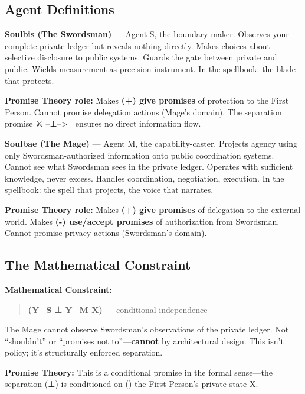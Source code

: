 \documentclass[
]{article}
\begin{document}
\subsection{Agent Definitions}\label{agent-definitions}

\textbf{Soulbis (The Swordsman)} --- Agent S, the boundary-maker.
Observes your complete private ledger but reveals nothing directly.
Makes choices about selective disclosure to public systems. Guards the
gate between private and public. Wields measurement as precision
instrument. In the spellbook: the blade that protects.

\textbf{Promise Theory role:} Makes \textbf{(+) give promises} of
protection to the First Person. Cannot promise delegation actions
(Mage's domain). The separation promise ⚔️ --⊥--\textgreater{} 🧙
ensures no direct information flow.

\textbf{Soulbae (The Mage)} --- Agent M, the capability-caster. Projects
agency using only Swordsman-authorized information onto public
coordination systems. Cannot see what Swordsman sees in the private
ledger. Operates with sufficient knowledge, never excess. Handles
coordination, negotiation, execution. In the spellbook: the spell that
projects, the voice that narrates.

\textbf{Promise Theory role:} Makes \textbf{(+) give promises} of
delegation to the external world. Makes \textbf{(-) use/accept promises}
of authorization from Swordsman. Cannot promise privacy actions
(Swordsman's domain).

\subsection{The Mathematical
Constraint}\label{the-mathematical-constraint}

\textbf{Mathematical Constraint:}

\begin{quote}
\textbf{(Y\_S ⊥ Y\_M \textbar{} X)} --- conditional independence
\end{quote}

The Mage cannot observe Swordsman's observations of the private ledger.
Not ``shouldn't'' or ``promises not to''---\textbf{cannot} by
architectural design. This isn't policy; it's structurally enforced
separation.

\textbf{Promise Theory:} This is a conditional promise in the formal
sense---the separation (⊥) is conditioned on (\textbar) the First
Person's private state X.
\end{document}
